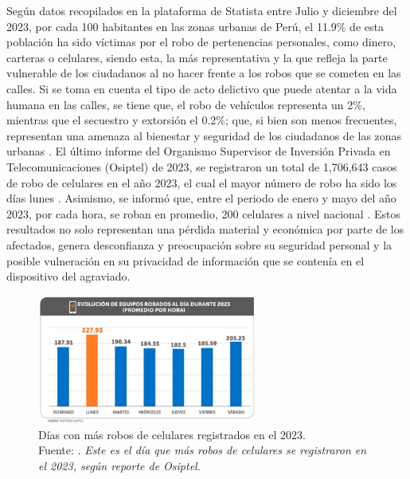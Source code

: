 Según datos recopilados en la plataforma de Statista entre Julio y diciembre del 2023, por cada 100 habitantes en las zonas urbanas de Perú, el 11.9\% de esta población ha sido víctimas por el robo de pertenencias personales, como dinero, carteras o celulares, siendo esta, la más representativa y la que refleja la parte vulnerable de los ciudadanos al no hacer frente a los robos que se cometen en las calles. Si se toma en cuenta el tipo de acto delictivo que puede atentar a la vida humana en las calles, se tiene que, el robo de vehículos representa un 2\%, mientras que el secuestro y extorsión el 0.2\%; que, si bien son menos frecuentes, representan una amenaza al bienestar y seguridad de los ciudadanos de las zonas urbanas \parencite{cu_statista2023}. El último informe del Organismo Supervisor de Inversión Privada en Telecomunicaciones (Osiptel) de 2023, se registraron un total de 1,706,643 casos de robo de celulares en el año 2023, el cual el mayor número de robo ha sido los días lunes \parencite{cu_infobae}. Asimismo, se informó que, entre el periodo de enero y mayo del año 2023, por cada hora, se roban en promedio, 200 celulares a nivel nacional \parencite{cu_comercio}. Estos resultados no solo representan una pérdida material y económica por parte de los afectados, genera desconfianza y preocupación sobre su seguridad personal y la posible vulneración en su privacidad de información que se contenía en el dispositivo del agraviado.
\begin{figure}[h]
	\begin{center}
		\includegraphics[width=0.65\textwidth]{1/figures/fig1.jpg}
		\caption[Días con más robos de celulares registrados en el 2023]{Días con más robos de celulares registrados en el 2023. \\ Fuente: \parencite{cu_infobae}. \textit{Este es el día que más robos de celulares se registraron en el 2023, según reporte de Osiptel}.}
		\label{1:fig2}
	\end{center}
\end{figure}




